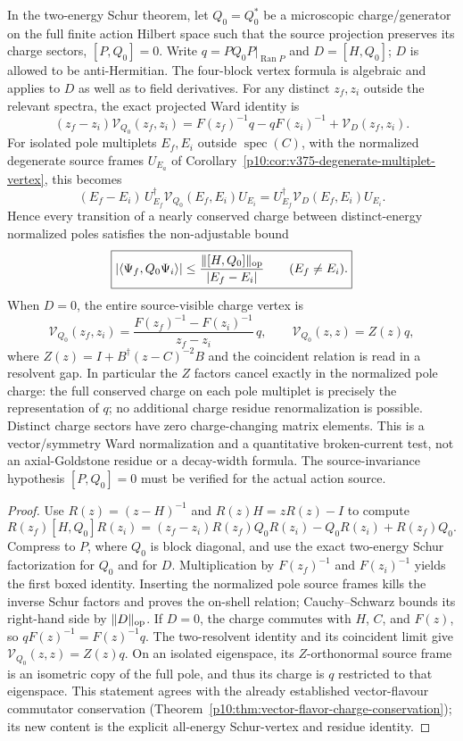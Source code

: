 \documentclass[12pt,a4paper]{article}
\begin{document}
\begin{theorem}
\label{p10:thm:v375-projected-Ward-current}
In the two-energy Schur theorem, let $Q_0=Q_0^*$ be a
microscopic charge/generator on the full finite action Hilbert
space such that the source projection preserves its charge sectors,
$[P,Q_0]=0$. Write $q=P Q_0 P|_{\operatorname{Ran}P}$ and
$D=[H,Q_0]$; $D$ is allowed to be anti-Hermitian.
The four-block vertex formula is algebraic and applies to $D$ as well
as to field derivatives. For any distinct $z_f,z_i$ outside the
relevant spectra, the exact projected Ward identity is
\[
\boxed{
 (z_f-z_i)\mathcal V_{Q_0}(z_f,z_i)
  =F(z_f)^{-1}q-qF(z_i)^{-1}
   +\mathcal V_D(z_f,z_i).}
\]
For isolated pole multiplets $E_f,E_i$ outside $\operatorname{spec}(C)$,
with the normalized degenerate source frames $U_{E_a}$ of
Corollary~\ref{p10:cor:v375-degenerate-multiplet-vertex}, this becomes
\[
 \boxed{(E_f-E_i)\,U_{E_f}^\dagger
 \mathcal V_{Q_0}(E_f,E_i)U_{E_i}
 =U_{E_f}^\dagger\mathcal V_D(E_f,E_i)U_{E_i}.}
\]
Hence every transition of a nearly conserved charge between
distinct-energy normalized poles satisfies the non-adjustable bound
\[
\boxed{|\langle\Psi_f,Q_0\Psi_i\rangle|
 \le\frac{\|[H,Q_0]\|_{\rm op}}{|E_f-E_i|}
 \qquad(E_f\ne E_i).}
\]
When $D=0$, the entire source-visible charge vertex is
\[
\boxed{
 \mathcal V_{Q_0}(z_f,z_i)
 =\frac{F(z_f)^{-1}-F(z_i)^{-1}}{z_f-z_i}\,q,
 \qquad \mathcal V_{Q_0}(z,z)=Z(z)q,}
\]
where $Z(z)=I+B^\dagger(z-C)^{-2}B$ and the coincident relation
is read in a resolvent gap. In particular the $Z$ factors cancel
exactly in the normalized pole charge: the full conserved charge
on each pole multiplet is precisely the representation of $q$;
no additional charge residue renormalization is possible. Distinct
charge sectors have zero charge-changing matrix elements.
This is a vector/symmetry Ward normalization and a quantitative
broken-current test, not an axial-Goldstone residue or a decay-width
formula. The source-invariance hypothesis $[P,Q_0]=0$ must be
verified for the actual action source.
\end{theorem}
\begin{proof}
Use $R(z)=(z-H)^{-1}$ and $R(z)H=zR(z)-I$ to compute
\[
 R(z_f)[H,Q_0]R(z_i)
 =(z_f-z_i)R(z_f)Q_0R(z_i)
   -Q_0R(z_i)+R(z_f)Q_0.
\]
Compress to $P$, where $Q_0$ is block diagonal, and use the exact
two-energy Schur factorization for $Q_0$ and for $D$. Multiplication
by $F(z_f)^{-1}$ and $F(z_i)^{-1}$ yields the first boxed identity.
Inserting the normalized pole source frames kills the inverse
Schur factors and proves the on-shell relation; Cauchy--Schwarz
bounds its right-hand side by $\|D\|_{\rm op}$.
If $D=0$, the charge commutes with $H$, $C$, and $F(z)$, so
$qF(z)^{-1}=F(z)^{-1}q$. The two-resolvent identity and its
coincident limit give $\mathcal V_{Q_0}(z,z)=Z(z)q$.
On an isolated eigenspace, its $Z$-orthonormal source frame is an
isometric copy of the full pole, and thus its charge is $q$
restricted to that eigenspace. This statement agrees with the
already established vector-flavour commutator conservation
(Theorem~\ref{p10:thm:vector-flavor-charge-conservation}); its new
content is the explicit all-energy Schur-vertex and residue identity.
\end{proof}
\end{document}

